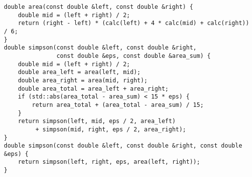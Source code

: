 \begin{lstlisting}
double area(const double &left, const double &right) {
    double mid = (left + right) / 2;
    return (right - left) * (calc(left) + 4 * calc(mid) + calc(right)) / 6;
}
double simpson(const double &left, const double &right,
               const double &eps, const double &area_sum) {
    double mid = (left + right) / 2;
    double area_left = area(left, mid);
    double area_right = area(mid, right);
    double area_total = area_left + area_right;
    if (std::abs(area_total - area_sum) < 15 * eps) {
        return area_total + (area_total - area_sum) / 15;
    }
    return simpson(left, mid, eps / 2, area_left)
         + simpson(mid, right, eps / 2, area_right);
}
double simpson(const double &left, const double &right, const double &eps) {
    return simpson(left, right, eps, area(left, right));
}
\end{lstlisting}
